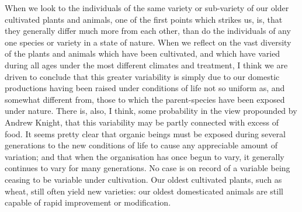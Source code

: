 \indent When we look to the individuals of the same variety or sub-variety of our older cultivated plants and animals, one of the first points which strikes us, is, that they generally differ much more from each other, than do the individuals of any one species or variety in a state of nature. When we reflect on the vast diversity of the plants and animals which have been cultivated, and which have varied during all ages under the most different climates and treatment, I think we are driven to conclude that this greater variability is simply due to our domestic productions having been raised under conditions of life not so uniform as, and somewhat different from, those to which the parent-species have been exposed under nature. There is, also, I think, some probability in the view propounded by Andrew Knight, that this variability may be partly connected with excess of food. It seems pretty clear that organic beings must be exposed during several generations to the new conditions of life to cause any appreciable amount of variation; and that when the organisation has once begun to vary, it generally continues to vary for many generations.  No case is on record of a variable being ceasing to be variable under cultivation. Our oldest cultivated plants, such as wheat, still often yield new varieties: our oldest domesticated animals are still capable of rapid improvement or modification.  \\
